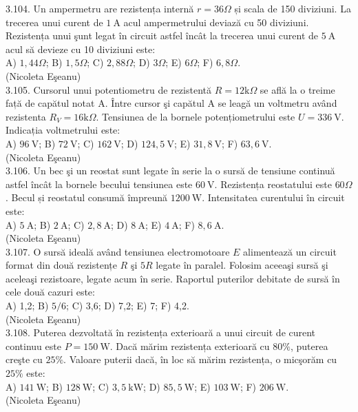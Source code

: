3.104. Un ampermetru are rezistența internă $r=36 \Omega$ și scala de 150 diviziuni. La trecerea unui curent de $1 \mathrm{~A}$ acul ampermetrului deviază cu 50 diviziuni. Rezistența unui şunt legat în circuit astfel încât la trecerea unui curent de $5 \mathrm{~A}$ acul să devieze cu 10 diviziuni este:\\ A) $1,44 \Omega$; B) $1,5 \Omega$; C) $2,88 \Omega$; D) $3 \Omega$; E) $6 \Omega$; F) $6,8 \Omega$.\\ (Nicoleta Eşeanu)\\

3.105. Cursorul unui potentiometru de rezistentă $R=12 \mathrm{k} \Omega$ se află la o treime față de capătul notat A. Între cursor şi capătul A se leagă un voltmetru având rezistenta $R_{V}=16 \mathrm{k} \Omega$. Tensiunea de la bornele potențiometrului este $U=336 \mathrm{~V}$. Indicația voltmetrului este:\\ A) $96 \mathrm{~V}$; B) $72 \mathrm{~V}$; C) $162 \mathrm{~V}$; D) $124,5 \mathrm{~V}$; E) $31,8 \mathrm{~V}$; F) $63,6 \mathrm{~V}$.\\ (Nicoleta Eşeanu)\\

3.106. Un bec şi un reostat sunt legate în serie la o sursă de tensiune continuă astfel încât la bornele becului tensiunea este $60 \mathrm{~V}$. Rezistența reostatului este $60 \Omega$. Becul și reostatul consumă împreună $1200 \mathrm{~W}$. Intensitatea curentului în circuit este:\\ A) $5 \mathrm{~A}$; B) $2 \mathrm{~A}$; C) $2,8 \mathrm{~A}$; D) $8 \mathrm{~A}$; E) $4 \mathrm{~A}$; F) $8,6 \mathrm{~A}$.\\ (Nicoleta Eşeanu)\\

3.107. O sursă ideală având tensiunea electromotoare $E$ alimentează un circuit format din două rezistențe $R$ şi $5 R$ legate în paralel. Folosim aceeaşi sursă şi aceleaşi rezistoare, legate acum în serie. Raportul puterilor debitate de sursă în cele două cazuri este:\\ A) 1,2; B) $5 / 6$; C) 3,6; D) 7,2; E) 7; F) 4,2.\\ (Nicoleta Eşeanu)\\

3.108. Puterea dezvoltată în rezistența exterioară a unui circuit de curent continuu este $P=150 \mathrm{~W}$. Dacă mărim rezistența exterioară cu $80 \%$, puterea creşte cu $25 \%$. Valoare puterii dacă, în loc să mărim rezistența, o micşorăm cu $25 \%$ este:\\ A) $141 \mathrm{~W}$; B) $128 \mathrm{~W}$; C) $3,5 \mathrm{~kW}$; D) $85,5 \mathrm{~W}$; E) $103 \mathrm{~W}$; F) $206 \mathrm{~W}$.\\ (Nicoleta Eşeanu)\\

